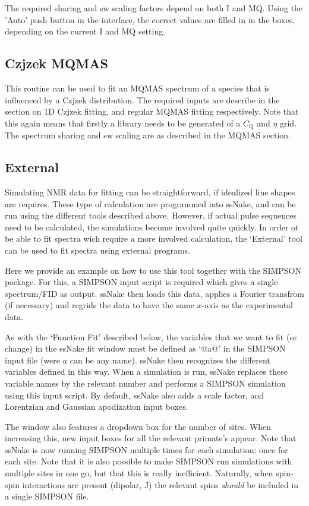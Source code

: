 \documentclass[11pt,a4paper]{article}
\begin{document}
The required sharing and sw scaling factors depend on both I and MQ. Using the 'Auto' push button in the interface, 
the correct values are filled in in the boxes, depending on the current I and MQ setting.


\subsection{Czjzek MQMAS}
This routine can be used to fit an MQMAS spectrum of a species that is influenced by a Czjzek distribution. The 
required inputs are describe in the section on 1D Czjzek fitting, and regular MQMAS fitting respectively. Note 
that this again means that firstly a library needs to be generated of a $C_\text{Q}$ and $\eta$ grid. The spectrum 
sharing and sw scaling are as described in the MQMAS section.


\subsection{External}
Simulating NMR data for fitting can be straightforward, if idealized line shapes are requires. These
type of calculation are programmed into ssNake, and can be run using the different tools described
above. However, if actual pulse sequences need to be calculated, the simulations become involved
quite quickly. In order ot be able to fit spectra wich require a more involved calculation, the
`External' tool can be used to fit spectra using external programs.


Here we provide an example on how to use this tool together with the SIMPSON package\cite{Bak2000SIMPSON,Tosner2014Computer,Tosner2009Optimal}.
For this, a SIMPSON input script is
required which gives a single spectrum/FID as output. ssNake then loads this data, applies a Fourier
transfrom (if necessary) and regrids the data to have the same $x$-axis as the experimental data.

As with the `Function Fit' described below, the variables that we want to fit (or change) in the
ssNake fit window must be defined as `@a@' in the SIMPSON input file (were $a$ can be any name). ssNake
then recognizes the different variables defined in this way. When a simulation is run, ssNake
replaces these variable names by the relevant number and performs a SIMPSON simulation using this
input script. By default, ssNake also adds a scale factor, and Lorentzian and Gaussian apodization
input boxes.

The window also features a dropdown box for the number of sites. When increasing this, new input
boxes for all the relevant primate's appear. Note that ssNake is now running SIMPSON multiple times
for each simulation: once for each site. Note that it is also possible to make SIMPSON run
simulations with multiple sites in one go, but that this is really inefficient. Naturally, when
spin-spin interactions are present (dipolar, J) the relevant spins \textit{should} be included in a single
SIMPSON file.
\end{document}
